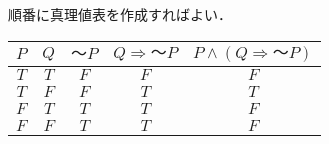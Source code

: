 \documentclass[a4paper,12pt]{ltjsarticle}
\begin{document}
\section{}
順番に真理値表を作成すればよい．
\begin{table}[htbp]
    \centering
    \begin{tabular}{ c|c|c|c|c }
        $P$ & $Q$ & $〜 P$ & $Q \Rightarrow 〜 P$ & $P \land (Q \Rightarrow 〜 P)$ \\
        \hline
        $T$ & $T$ & $F$ & $F$ & $F$ \\
        $T$ & $F$ & $F$ & $T$ & $T$ \\
        $F$ & $T$ & $T$ & $T$ & $F$ \\
        $F$ & $F$ & $T$ & $T$ & $F$
    \end{tabular}
\end{table}
\end{document}
